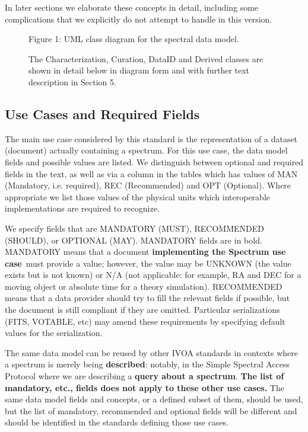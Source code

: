 \documentclass[11pt]{article}
\begin{document}
\vskip 0.1in

In later sections we elaborate these concepts in detail, including some
complications that we explicitly do not attempt to handle in this
version.


\begin{figure}[h]

\colorbox{iblue}{
}




\colorbox{iblue}{

\begin{minipage}{6.0in}
Figure 1: 
UML class diagram for the spectral data model.

The Characterization, Curation, DataID and Derived classes are 
shown in detail below in diagram form and
with further text description in Section 5.
\end{minipage}
}
\end{figure}


\subsection{Use Cases and Required Fields}

The main use case considered by this standard is the representation
of a dataset (document) actually containing a spectrum. 
For this use case,
the data model fields and possible values
are listed. 
We distinguish between optional and required fields in the
text, as well as via a 
column in the tables which has values of MAN (Mandatory, i.e. required),
REC (Recommended) and OPT (Optional).
Where appropriate we list those values of the physical units which interoperable
implementations are required to recognize.

We specify fields that are MANDATORY (MUST), RECOMMENDED (SHOULD), or
OPTIONAL (MAY). MANDATORY fields are in bold. MANDATORY means that a
document {\bf implementing the Spectrum use case}~must provide a value; however, the value may be UNKNOWN (the
value exists but is not known) or N/A (not applicable: for example, RA
and DEC for a moving object or absolute time for a theory simulation).
RECOMMENDED means that a data provider should try to fill the relevant
fields if possible, but the document is still compliant if they are
omitted. Particular serializations (FITS, VOTABLE, etc) may 
amend these requirements by specifying default values for the
serialization. 

The same data model can be reused by other IVOA standards in contexts where a spectrum is
merely being {\bf described}: notably, in the Simple Spectral Access
Protocol where we are describing a {\bf query about a spectrum}. {\bf
The list of mandatory, etc., fields does not apply to these other use cases.}
The same data model fields and concepts, or a
defined subset of them, should be used, but the list of mandatory,
recommended and optional fields will be different and should be
identified in the standards defining those use cases.
\end{document}
